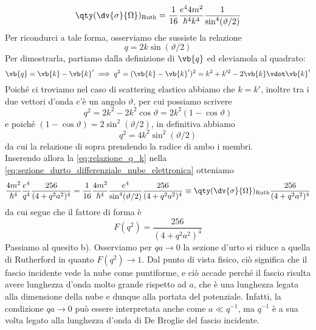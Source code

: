 \begin{soluzione}
   \begin{equation*}
      \qty( \dv{\sigma}{\Omega} )_{\rm Ruth}
      =\frac{1}{16} \frac{e^4 4 m^2}{\hbar^4 k^4} \frac{1}{\sin^4(\vartheta/2)}
   \end{equation*}
   Per ricondurci a tale forma, osserviamo che sussiste la relazione
   \begin{equation}
      q=2k \sin(\vartheta/2)
      \label{eq:relazione_q_k}
   \end{equation}
   Per dimostrarla, partiamo dalla definizione di $\vb{q}$ ed eleviamola al quadrato:
   \begin{equation*}
      \vb{q}
      =\vb{k} - \vb{k}'
      \implies
      q^2
      =(\vb{k} - \vb{k}')^2
      =k^2 + k'^2 - 2\vb{k} \vdot \vb{k}'
   \end{equation*}
   Poiché ci troviamo nel caso di scattering elastico abbiamo che $k=k'$, inoltre tra i due vettori d'onda c'è un angolo $\vartheta$, per cui possiamo scrivere
   \begin{equation*}
      q^2
      =2k^2 - 2 k^2 \cos{\vartheta}
      =2k^2 ( 1 - \cos{\vartheta} )
   \end{equation*}
   e poiché $(1 - \cos{\vartheta})=2 \sin^2(\vartheta/2)$, in definitiva abbiamo
   \begin{equation*}
      q^2
      =4k^2 \sin^2(\vartheta/2)
   \end{equation*}
   da cui la relazione di sopra prendendo la radice di ambo i membri.\\
   Inserendo allora la \eqref{eq:relazione_q_k} nella \eqref{eq:sezione_durto_differenziale_nube_elettronica} otteniamo
   \begin{equation*}
      \frac{4m^2}{\hbar^4} \frac{e^4}{q^4} \frac{256}{(4 + q^2 a^2)^4}
      =\frac{1}{16} \frac{4m^2}{\hbar^4} \frac{e^4}{\sin^4(\vartheta/2)} \frac{256}{(4 + q^2 a^2)^4}
      \equiv \qty( \dv{\sigma}{\Omega} )_{\rm Ruth} \frac{256}{(4 + q^2 a^2)^4}
   \end{equation*}
   da cui segue che il fattore di forma è
   \begin{equation*}
      F(q^2)
      =\frac{256}{(4 + q^2 a^2)^4}
   \end{equation*}
   Passiamo al quesito b). Osserviamo per $qa \to 0$ la sezione d'urto si riduce a quella di Rutherford in quanto $F(q^2) \to 1$. Dal punto di vista fisico, ciò significa che il fascio incidente vede la nube come puntiforme, e ciò accade perché il fascio risulta avere lunghezza d'onda molto grande rispetto ad $a$, che è una lunghezza legata alla dimensione della nube e dunque alla portata del potenziale. Infatti, la condizione $qa \to 0$ può essere interpretata anche come $a \ll q^{-1}$, ma $q^{-1}$ è a sua volta legato alla lunghezza d'onda di De Broglie del fascio incidente.\\

\end{soluzione}
